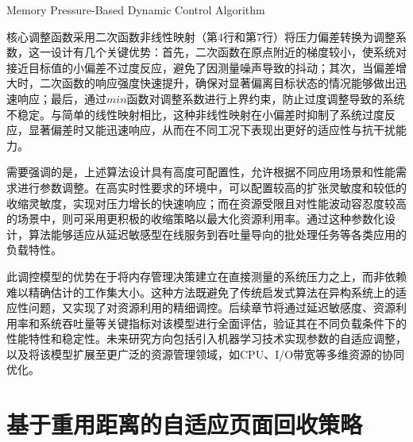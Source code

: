 \begin{algorithm}[htb]
  \caption{Memory Pressure-Based Dynamic Control Algorithm}
  \label{alg:control}
\end{algorithm}
核心调整函数采用二次函数非线性映射（第4行和第7行）将压力偏差转换为调整系数，这一设计有几个关键优势：首先，二次函数在原点附近的梯度较小，使系统对接近目标值的小偏差不过度反应，避免了因测量噪声导致的抖动；其次，当偏差增大时，二次函数的响应强度快速提升，确保对显著偏离目标状态的情况能够做出迅速响应；最后，通过\(min\)函数对调整系数进行上界约束，防止过度调整导致的系统不稳定。与简单的线性映射相比，这种非线性映射在小偏差时抑制了系统过度反应，显著偏差时又能迅速响应，从而在不同工况下表现出更好的适应性与抗干扰能力。

需要强调的是，上述算法设计具有高度可配置性，允许根据不同应用场景和性能需求进行参数调整。在高实时性要求的环境中，可以配置较高的扩张灵敏度和较低的收缩灵敏度，实现对压力增长的快速响应；而在资源受限且对性能波动容忍度较高的场景中，则可采用更积极的收缩策略以最大化资源利用率。通过这种参数化设计，算法能够适应从延迟敏感型在线服务到吞吐量导向的批处理任务等各类应用的负载特性。

此调控模型的优势在于将内存管理决策建立在直接测量的系统压力之上，而非依赖难以精确估计的工作集大小。这种方法既避免了传统启发式算法在异构系统上的适应性问题，又实现了对资源利用的精细调控。后续章节将通过延迟敏感度、资源利用率和系统吞吐量等关键指标对该模型进行全面评估，验证其在不同负载条件下的性能特性和稳定性。未来研究方向包括引入机器学习技术实现参数的自适应调整，以及将该模型扩展至更广泛的资源管理领域，如CPU、I/O带宽等多维资源的协同优化。

\section{基于重用距离的自适应页面回收策略}
\label{sec:基于重用距离的冷热页面优化}

